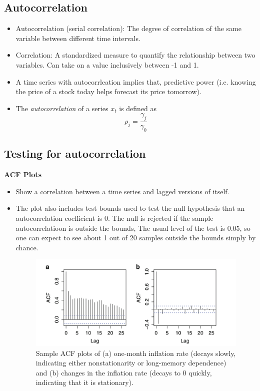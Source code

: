 \documentclass[11pt]{article}
\begin{document}
\subsection{Autocorrelation}
\begin{itemize}
    \item Autocorrelation (serial correlation): The degree of correlation of the same variable 
    between different time intervals.
    \item Correlation: A standardized measure to quantify the relationship between two 
    variables. Can take on a value inclusively between -1 and 1.
    \item A time series with autocorrleation implies that, predictive power (i.e. knowing the
    price of a stock today helps forecast its price tomorrow).
    \item The \textit{autocorrelation} of a series $x_t$ is defined as 
    \[\rho_j = \frac{\gamma_j}{\gamma_0}\]
\end{itemize}

\subsection{Testing for autocorrelation}
\textbf{ACF Plots}
\begin{itemize}
    \item Show a correlation between a time series and lagged versions of itself. 
    \item The plot also includes test bounds used to test the null hypothesis that an 
    autocorrelation coefficient is 0. The null is rejected if the sample autocorrelatioon is
    outside the bounds, The usual level of the test is 0.05, so one can expect to see about 1
    out of 20 samples outside the bounds simply by chance. 

    \begin{figure}[H] 
        \centering 
        \includegraphics[width=5in]{imgs/acf_plots.png}
        \caption{Sample ACF plots of (a) one-month inflation rate (decays slowly, indicating 
        either nonstationarity or long-memory dependence) and (b) changes in the inflation rate
        (decays to 0 quickly, indicating that it is stationary).}
    \end{figure}

\end{itemize}
\end{document}
